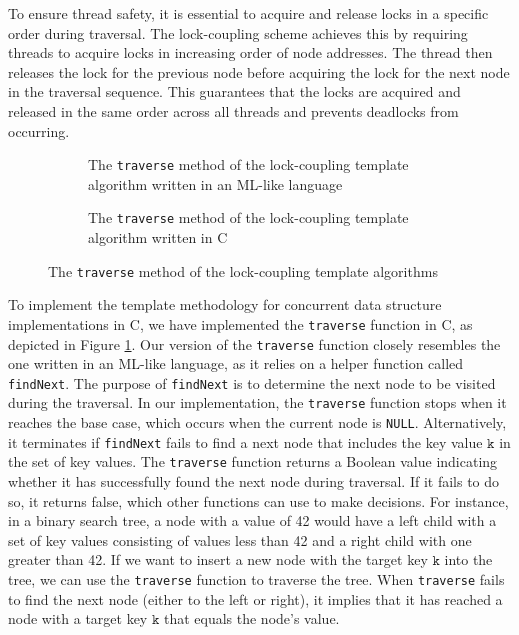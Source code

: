 \documentclass[a4paper,UKenglish,cleveref, autoref, thm-restate]{lipics-v2021}
\newcommand{\than}[1]{\textbf{\textcolor{blue}{[Than: #1]}}}
\newcommand{\wm}[1]{\textbf{\textcolor{violet}{[Willam: #1]}}}
\begin{document}
To ensure thread safety, it is essential to acquire and release locks in a specific order during traversal. The lock-coupling scheme achieves this by requiring threads to acquire locks in increasing order of node addresses. The thread then releases the lock for the previous node before acquiring the lock for the next node in the traversal sequence. This guarantees that the locks are acquired and released in the same order across all threads and prevents deadlocks from occurring.

\begin{figure}[ht]
	\begin{subfigure}[t]{0.45\textwidth}
		 
		\caption{The \lstinline{traverse} method of the lock-coupling template algorithm written in an ML-like language \cite{krishna2019compositional}} 
		\label{traverse_lock_a}	
	\end{subfigure}\qquad
	\begin{subfigure}[t]{0.48\textwidth}
		 
		\caption{The \lstinline{traverse} method of the lock-coupling template algorithm written in C}
		\label{traverse_lock_b}
	\end{subfigure}
	\caption{The \lstinline{traverse} method of the lock-coupling template algorithms}
	\label{traverse_lock}
\end{figure}

To implement the template methodology for concurrent data structure implementations in C, we have implemented the \lstinline{traverse} function in C, as depicted in Figure \ref{traverse_lock_a}.  Our version of the \lstinline{traverse} function closely resembles the one written in an ML-like language, as it relies on a helper function called \lstinline{findNext}. The purpose of \lstinline{findNext} is to determine the next node to be visited during the traversal. In our implementation, the \lstinline{traverse} function stops when it reaches the base case, which occurs when the current node is \lstinline{NULL}. Alternatively, it terminates if \lstinline{findNext} fails to find a next node that includes the key value $\texttt{k}$ in the set of key values. The \lstinline{traverse} function returns a Boolean value indicating whether it has successfully found the next node during traversal. If it fails to do so, it returns false, which other functions can use to make decisions. For instance, in a binary search tree, a node with a value of 42 would have a left child with a set of key values consisting of values less than 42 and a right child with one greater than 42. If we want to insert a new node with the target key $\texttt{k}$ into the tree, we can use the \lstinline{traverse} function to traverse the tree. When \lstinline{traverse} fails to find the next node (either to the left or right), it implies that it has reached a node with a target key $\texttt{k}$ that equals the node's value. 
\end{document}
